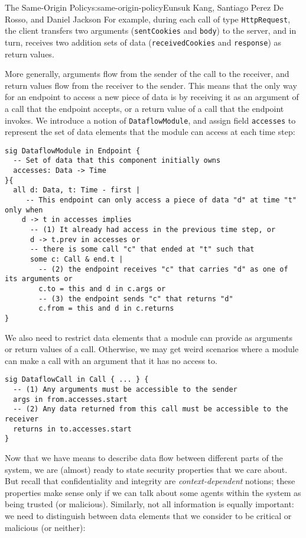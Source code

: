 \begin{aosachapter}{The Same-Origin Policy}{s:same-origin-policy}{Eunsuk Kang, Santiago Perez De Rosso, and Daniel Jackson}
For example, during each call of type \texttt{HttpRequest}, the client
transfers two arguments (\texttt{sentCookies} and \texttt{body}) to the
server, and in turn, receives two addition sets of data
(\texttt{receivedCookies} and \texttt{response}) as return values.

More generally, arguments flow from the sender of the call to the
receiver, and return values flow from the receiver to the sender. This
means that the only way for an endpoint to access a new piece of data is
by receiving it as an argument of a call that the endpoint accepts, or a
return value of a call that the endpoint invokes. We introduce a notion
of \texttt{DataflowModule}, and assign field \texttt{accesses} to
represent the set of data elements that the module can access at each
time step:

\begin{verbatim}
sig DataflowModule in Endpoint {
  -- Set of data that this component initially owns
  accesses: Data -> Time
}{
  all d: Data, t: Time - first |
     -- This endpoint can only access a piece of data "d" at time "t" only when
    d -> t in accesses implies
      -- (1) It already had access in the previous time step, or
      d -> t.prev in accesses or
      -- there is some call "c" that ended at "t" such that
      some c: Call & end.t |
        -- (2) the endpoint receives "c" that carries "d" as one of its arguments or
        c.to = this and d in c.args or
        -- (3) the endpoint sends "c" that returns "d" 
        c.from = this and d in c.returns 
}
\end{verbatim}

We also need to restrict data elements that a module can provide as
arguments or return values of a call. Otherwise, we may get weird
scenarios where a module can make a call with an argument that it has no
access to.

\begin{verbatim}
sig DataflowCall in Call { ... } {
  -- (1) Any arguments must be accessible to the sender
  args in from.accesses.start
  -- (2) Any data returned from this call must be accessible to the receiver
  returns in to.accesses.start
}
\end{verbatim}

Now that we have means to describe data flow between different parts of
the system, we are (almost) ready to state security properties that we
care about. But recall that confidentiality and integrity are
\emph{context-dependent} notions; these properties make sense only if we
can talk about some agents within the system as being trusted (or
malicious). Similarly, not all information is equally important: we need
to distinguish between data elements that we consider to be critical or
malicious (or neither):


\end{aosachapter}

